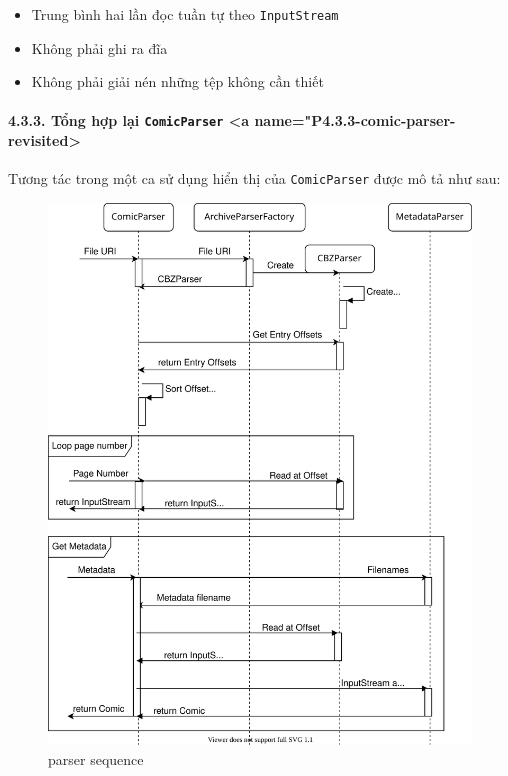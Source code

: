 \documentclass[
]{article}
\begin{document}
\begin{itemize}
\item
  Trung bình hai lần đọc tuần tự theo \texttt{InputStream}
\item
  Không phải ghi ra đĩa
\item
  Không phải giải nén những tệp không cần thiết
\end{itemize}

\hypertarget{tux1ed5ng-hux1ee3p-lux1ea1i-comicparser-a-namep4.3.3-comic-parser-revisited}{%
\paragraph{\texorpdfstring{4.3.3. Tổng hợp lại \texttt{ComicParser}
\textless a
name="P4.3.3-comic-parser-revisited>}{4.3.3. Tổng hợp lại ComicParser \textless a name="P4.3.3-comic-parser-revisited>}}\label{tux1ed5ng-hux1ee3p-lux1ea1i-comicparser-a-namep4.3.3-comic-parser-revisited}}

Tương tác trong một ca sử dụng hiển thị của \texttt{ComicParser} được mô
tả như sau:

\begin{figure}
\centering
\includegraphics{../images/parser_sequence.svg}
\caption{parser sequence}
\end{figure}
\end{document}
